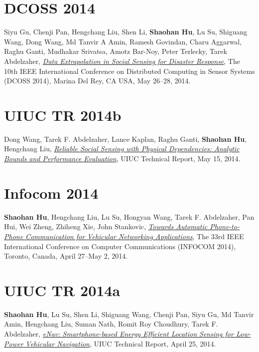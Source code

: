\section{\sc DCOSS 2014}\hypertarget{gu2014dcoss}{} Siyu Gu, Chenji Pan, Hengchang Liu, Shen Li, \textbf{Shaohan Hu}, Lu Su, Shiguang Wang, Dong Wang, Md Tanvir A Amin, Ramesh Govindan, Charu Aggarwal, Raghu Ganti, Mudhakar Srivatsa, Amotz Bar-Noy, Peter Terlecky, Tarek Abdelzaher, \href{http://ieeexplore.ieee.org/xpl/articleDetails.jsp?arnumber=6846153}{\emph{Data Extrapolation in Social Sensing for Disaster Response}}, \textsf{The 10th IEEE International Conference on Distributed Computing in Sensor Systems (DCOSS 2014)}, Marina Del Rey, CA USA, May 26--28, 2014.

\section{\sc UIUC TR 2014b}\hypertarget{wang2014uiuc}{} Dong Wang, Tarek F. Abdelzaher, Lance Kaplan, Raghu Ganti, \textbf{Shaohan Hu}, Hengchang Liu, \href{https://www.ideals.illinois.edu/handle/2142/49113}{\emph{Reliable Social Sensing with Physical Dependencies: Analytic Bounds and Performance Evaluation}}, \textsf{UIUC Technical Report}, May 15, 2014.

\section{\sc Infocom 2014}\hypertarget{hu2014infocom}{} \textbf{Shaohan Hu}, Hengchang Liu, Lu Su, Hongyan Wang, Tarek F. Abdelzaher, Pan Hui, Wei Zheng, Zhiheng Xie, John Stankovic, \href{http://ieeexplore.ieee.org/xpl/articleDetails.jsp?arnumber=6848113}{\emph{Towards Automatic Phone-to-Phone Communication for Vehicular Networking Applications}}, \textsf{The 33rd IEEE International Conference on Computer Communications (INFOCOM 2014)}, Toronto, Canada, April 27--May 2, 2014.

\section{\sc UIUC TR 2014a }\hypertarget{hu2014uiuc1}{} \textbf{Shaohan Hu}, Lu Su, Shen Li, Shiguang Wang, Chenji Pan, Siyu Gu, Md Tanvir Amin, Hengchang Liu, Suman Nath, Romit Roy Choudhury, Tarek F. Abdelzaher, \href{https://www.ideals.illinois.edu/handle/2142/48917}{\emph{eNav: Smartphone-based Energy Efficient Location Sensing for Low-Power Vehicular Navigation}}, \textsf{UIUC Technical Report}, April 25, 2014.

